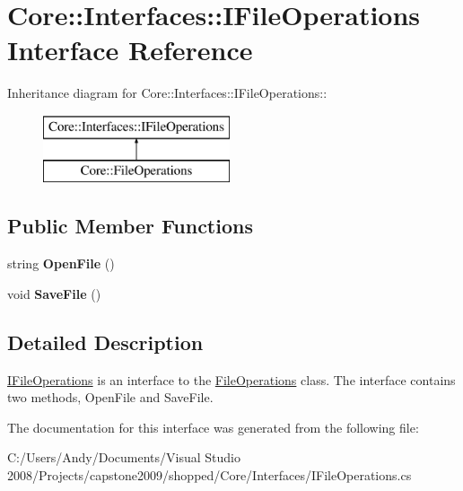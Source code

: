 \hypertarget{interface_core_1_1_interfaces_1_1_i_file_operations}{
\section{Core::Interfaces::IFileOperations Interface Reference}
\label{interface_core_1_1_interfaces_1_1_i_file_operations}
}
Inheritance diagram for Core::Interfaces::IFileOperations::\begin{figure}[H]
\begin{center}
\leavevmode
\includegraphics[height=2cm]{interface_core_1_1_interfaces_1_1_i_file_operations}
\end{center}
\end{figure}
\subsection*{Public Member Functions}
\begin{DoxyCompactItemize}
\item 
\hypertarget{interface_core_1_1_interfaces_1_1_i_file_operations_aec80e6b3603df802921200e0283bcfb4}{
string {\bfseries OpenFile} ()}
\label{interface_core_1_1_interfaces_1_1_i_file_operations_aec80e6b3603df802921200e0283bcfb4}

\item 
\hypertarget{interface_core_1_1_interfaces_1_1_i_file_operations_aca85ddd0bbb70e71cc1d7b2f5caf5b27}{
void {\bfseries SaveFile} ()}
\label{interface_core_1_1_interfaces_1_1_i_file_operations_aca85ddd0bbb70e71cc1d7b2f5caf5b27}

\end{DoxyCompactItemize}


\subsection{Detailed Description}
\hyperlink{interface_core_1_1_interfaces_1_1_i_file_operations}{IFileOperations} is an interface to the \hyperlink{class_core_1_1_file_operations}{FileOperations} class. The interface contains two methods, OpenFile and SaveFile. 

The documentation for this interface was generated from the following file:\begin{DoxyCompactItemize}
\item 
C:/Users/Andy/Documents/Visual Studio 2008/Projects/capstone2009/shopped/Core/Interfaces/IFileOperations.cs\end{DoxyCompactItemize}
